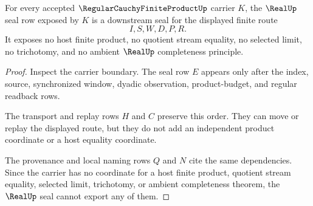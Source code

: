 \begin{theorem}\label{thm:regular-cauchy-finite-product-real-seal-nonescape}
For every accepted $\RegularCauchyFiniteProductUp$ carrier $K$, the $\RealUp$ seal row exposed by $K$ is a downstream seal for the displayed finite route
$$
I,S,W,D,P,R .
$$
It exposes no host finite product, no quotient stream equality, no selected limit, no trichotomy, and no ambient $\RealUp$ completeness principle.
\end{theorem}
\begin{proof}
Inspect the carrier boundary. The seal row $E$ appears only after the index, source, synchronized window, dyadic observation, product-budget, and regular readback rows.

The transport and replay rows $H$ and $C$ preserve this order. They can move or replay the displayed route, but they do not add an independent product coordinate or a host equality coordinate.

The provenance and local naming rows $Q$ and $N$ cite the same dependencies. Since the carrier has no coordinate for a host finite product, quotient stream equality, selected limit, trichotomy, or ambient completeness theorem, the $\RealUp$ seal cannot export any of them.
\end{proof}

